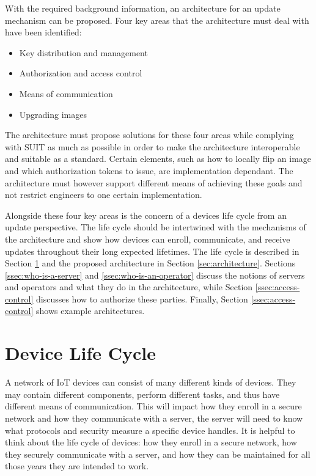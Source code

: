 \documentclass[0-thesis.tex]{subfiles}
\begin{document}
With the required background information, an architecture for an update mechanism can be
proposed. Four key areas that the architecture must deal with have been identified:

\begin{itemize}
    \item Key distribution and management
    \item Authorization and access control
    \item Means of communication
    \item Upgrading images
\end{itemize}

The architecture must propose solutions for these four areas while complying with SUIT as
much as possible in order to make the architecture interoperable and suitable as a
standard. Certain elements, such as how to locally flip an image and which authorization
tokens to issue, are implementation dependant. The architecture must however support
different means of achieving these goals and not restrict engineers to one certain
implementation.

Alongside these four key areas is the concern of a devices life cycle from an update
perspective. The life cycle should be intertwined with the mechanisms of the architecture
and show how devices can enroll, communicate, and receive updates throughout their long
expected lifetimes. The life cycle is described in Section \ref{sec:device-lifecycle} and the
proposed architecture in Section \ref{sec:architecture}. Sections
\ref{ssec:who-is-a-server} and \ref{ssec:who-is-an-operator} discuss the notions of
servers and operators and what they do in the architecture, while Section
\ref{ssec:access-control} discusses how to authorize these parties. Finally, Section
\ref{ssec:access-control} shows example architectures.

\section{Device Life Cycle}
\label{sec:device-lifecycle}
A network of IoT devices can consist of many different kinds of devices. They may contain
different components, perform different tasks, and thus have different means of
communication. This will impact how they enroll in a secure network and how they
communicate with a server, the server will need to know what protocols and security
measure a specific device handles. It is helpful to think about the life cycle of devices:
how they enroll in a secure network, how they securely communicate with a server, and how
they can be maintained for all those years they are intended to work.
\end{document}
